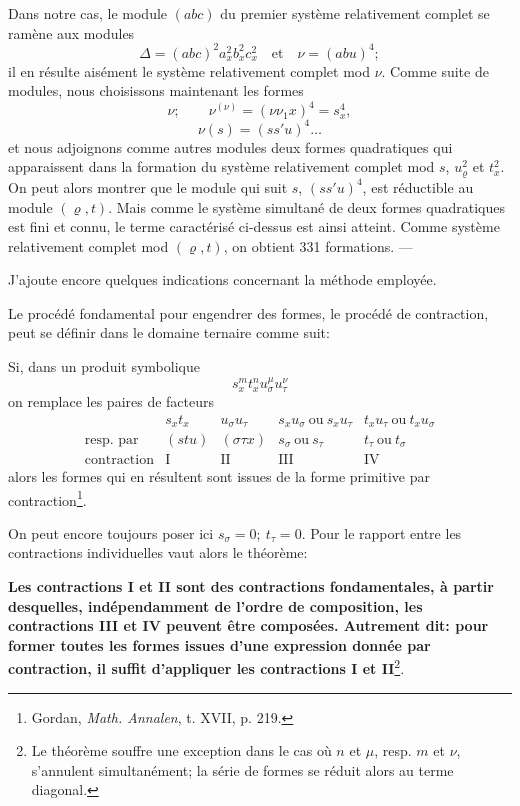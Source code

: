 \documentclass[11pt]{article}
\begin{document}
Dans notre cas, le module $(abc)$ du premier système relativement complet se ramène aux modules
\[
\Delta=(abc)^2a_x^2b_x^2c_x^2\quad\text{et}\quad \nu=(abu)^4;
\]
il en résulte aisément le système relativement complet mod $\nu$. Comme suite de modules, nous choisissons maintenant les formes
\[
\nu;\qquad \nu^{(\nu)}=(\nu\nu_1x)^4=s_x^4,
\]
\[
\nu(s)=(ss'u)^4\ldots
\]
et nous adjoignons comme autres modules deux formes quadratiques qui apparaissent dans la formation du système relativement complet mod $s$, $u_\varrho^2$ et $t_x^2$. On peut alors montrer que le module qui suit $s$, $(ss'u)^4$, est réductible au module $(\varrho,t)$. Mais comme le système simultané de deux formes quadratiques est fini et connu, le terme caractérisé ci-dessus est ainsi atteint. Comme système relativement complet mod $(\varrho,t)$, on obtient 331 formations. ---

J'ajoute encore quelques indications concernant la méthode employée.

Le procédé fondamental pour engendrer des formes, le procédé de contraction, peut se définir dans le domaine ternaire comme suit:

Si, dans un produit symbolique
\[
s_x^m t_x^n u_\sigma^\mu u_\tau^\nu
\]
on remplace les paires de facteurs
\[
\begin{array}{c|c|c|c|c}
 & s_xt_x & u_\sigma u_\tau & s_xu_\sigma\ \text{ou}\ s_xu_\tau & t_xu_\tau\ \text{ou}\ t_xu_\sigma\\
\text{resp. par} & (stu) & (\sigma\tau x) & s_\sigma\ \text{ou}\ s_\tau & t_\tau\ \text{ou}\ t_\sigma\\
\text{contraction} & \mathrm{I} & \mathrm{II} & \mathrm{III} & \mathrm{IV}
\end{array}
\]
alors les formes qui en résultent sont issues de la forme primitive par contraction\footnote{Gordan, \emph{Math. Annalen}, t. XVII, p. 219.}.

On peut encore toujours poser ici $s_\sigma=0;\ t_\tau=0$. Pour le rapport entre les contractions individuelles vaut alors le théorème:

\textbf{Les contractions I et II sont des contractions fondamentales, à partir desquelles, indépendamment de l'ordre de composition, les contractions III et IV peuvent être composées. Autrement dit: pour former toutes les formes issues d'une expression donnée par contraction, il suffit d'appliquer les contractions I et II}\footnote{Le théorème souffre une exception dans le cas où $n$ et $\mu$, resp. $m$ et $\nu$, s'annulent simultanément; la \og série de formes \fg{} se réduit alors au terme diagonal.}.
\end{document}
